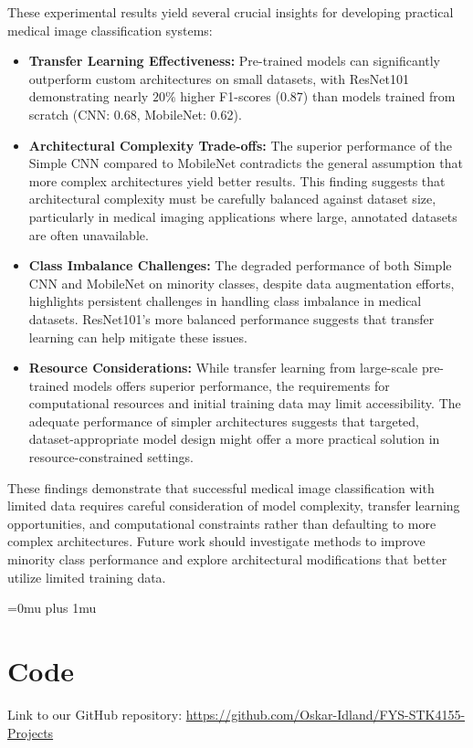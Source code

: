 \documentclass[aps,pra,english,notitlepage,reprint,nofootinbib]{revtex4-1}  %
\begin{document}
These experimental results yield several crucial insights for developing practical medical image classification systems:

\begin{itemize}
    \item \textbf{Transfer Learning Effectiveness:} Pre-trained models can significantly outperform custom architectures on small datasets,  with ResNet101 demonstrating nearly $20\%$ higher F1-scores (0.87) than models trained from scratch (CNN: 0.68, MobileNet: 0.62).
    \item \textbf{Architectural Complexity Trade-offs:} The superior performance of the Simple CNN compared to MobileNet contradicts the general assumption that more complex architectures yield better results. This finding suggests that architectural complexity must be carefully balanced against dataset size, particularly in medical imaging applications where large, annotated datasets are often unavailable.
    \item \textbf{Class Imbalance Challenges:} The degraded performance of both Simple CNN and MobileNet on minority classes, despite data augmentation efforts, highlights persistent challenges in handling class imbalance in medical datasets. ResNet101's more balanced performance suggests that transfer learning can help mitigate these issues.
    \item \textbf{Resource Considerations:} While transfer learning from large-scale pre-trained models offers superior performance, the requirements for computational resources and initial training data may limit accessibility. The adequate performance of simpler architectures suggests that targeted, dataset-appropriate model design might offer a more practical solution in resource-constrained settings.
\end{itemize}

These findings demonstrate that successful medical image classification with limited data requires careful consideration of model complexity, transfer learning opportunities, and computational constraints rather than defaulting to more complex architectures. Future work should investigate methods to improve minority class performance and explore architectural modifications that better utilize limited training data.

\Urlmuskip=0mu plus 1mu\relax
\onecolumngrid


\newpage
\appendix
\section{Code}\label{appsec:code}
Link to our GitHub repository: \href{https://github.com/Oskar-Idland/FYS-STK4155-Projects}{https://github.com/Oskar-Idland/FYS-STK4155-Projects}
\end{document}
